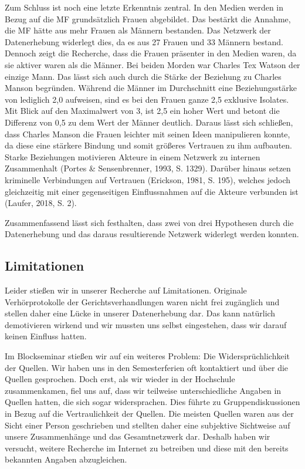 \documentclass[
]{article}
\begin{document}
Zum Schluss ist noch eine letzte Erkenntnis zentral. In den Medien
werden in Bezug auf die MF grundsätzlich Frauen abgebildet. Das bestärkt
die Annahme, die MF hätte aus mehr Frauen als Männern bestanden. Das
Netzwerk der Datenerhebung widerlegt dies, da es aus 27 Frauen und 33
Männern bestand. Dennoch zeigt die Recherche, dass die Frauen präsenter
in den Medien waren, da sie aktiver waren als die Männer. Bei beiden
Morden war Charles Tex Watson der einzige Mann. Das lässt sich auch
durch die Stärke der Beziehung zu Charles Manson begründen. Während die
Männer im Durchschnitt eine Beziehungsstärke von lediglich 2,0
aufweisen, sind es bei den Frauen ganze 2,5 exklusive Isolates. Mit
Blick auf den Maximalwert von 3, ist 2,5 ein hoher Wert und betont die
Differenz von 0,5 zu dem Wert der Männer deutlich. Daraus lässt sich
schließen, dass Charles Manson die Frauen leichter mit seinen Ideen
manipulieren konnte, da diese eine stärkere Bindung und somit größeres
Vertrauen zu ihm aufbauten. Starke Beziehungen motivieren Akteure in
einem Netzwerk zu internen Zusammenhalt (Portes \& Sensenbrenner, 1993,
S. 1329). Darüber hinaus setzen kriminelle Verbindungen auf Vertrauen
(Erickson, 1981, S. 195), welches jedoch gleichzeitig mit einer
gegenseitigen Einflussnahmen auf die Akteure verbunden ist (Laufer,
2018, S. 2).

Zusammenfassend lässt sich festhalten, dass zwei von drei Hypothesen
durch die Datenerhebung und das daraus resultierende Netzwerk widerlegt
werden konnten.

\hypertarget{limitationen}{%
\subsection{Limitationen}\label{limitationen}}

Leider stießen wir in unserer Recherche auf Limitationen. Originale
Verhörprotokolle der Gerichtsverhandlungen waren nicht frei zugänglich
und stellen daher eine Lücke in unserer Datenerhebung dar. Das kann
natürlich demotivieren wirkend und wir mussten uns selbst eingestehen,
dass wir darauf keinen Einfluss hatten.

Im Blockseminar stießen wir auf ein weiteres Problem: Die
Widersprüchlichkeit der Quellen. Wir haben uns in den Semesterferien oft
kontaktiert und über die Quellen gesprochen. Doch erst, als wir wieder
in der Hochschule zusammenkamen, fiel uns auf, dass wir teilweise
unterschiedliche Angaben in Quellen hatten, die sich sogar
widersprachen. Dies führte zu Gruppendiskussionen in Bezug auf die
Vertraulichkeit der Quellen. Die meisten Quellen waren aus der Sicht
einer Person geschrieben und stellten daher eine subjektive Sichtweise
auf unsere Zusammenhänge und das Gesamtnetzwerk dar. Deshalb haben wir
versucht, weitere Recherche im Internet zu betreiben und diese mit den
bereits bekannten Angaben abzugleichen.
\end{document}
